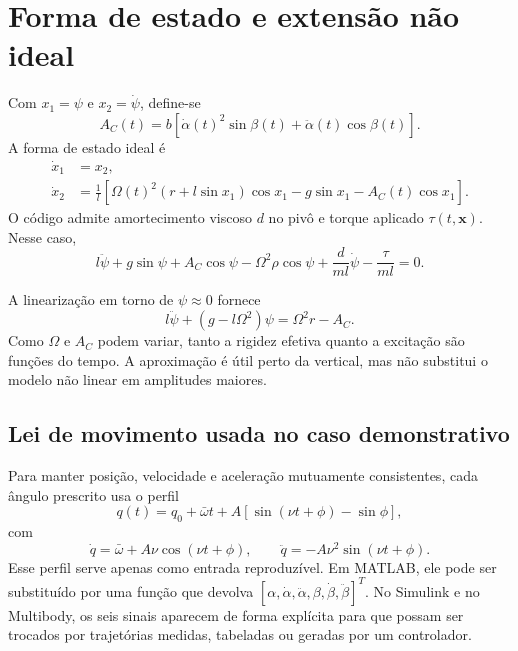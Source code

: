 \documentclass[11pt,a4paper]{article}
\newcommand{\bvec}[1]{\bm{#1}}
\begin{document}
\section{Forma de estado e extensão não ideal}

Com $x_1=\psi$ e $x_2=\dot\psi$, define-se
\begin{equation}
A_C(t)=b\left[\dot\alpha(t)^2\sin\beta(t)
+\ddot\alpha(t)\cos\beta(t)\right].
\end{equation}
A forma de estado ideal é
\begin{align}
\dot x_1&=x_2,\\
\dot x_2&=\frac{1}{l}\left[
\Omega(t)^2(r+l\sin x_1)\cos x_1-g\sin x_1-A_C(t)\cos x_1
\right].
\label{eq:state}
\end{align}
O código admite amortecimento viscoso $d$ no pivô e torque aplicado
$\tau(t,\bvec x)$. Nesse caso,
\begin{equation}
l\ddot\psi+g\sin\psi+A_C\cos\psi
-\Omega^2\rho\cos\psi
+\frac{d}{ml}\dot\psi-\frac{\tau}{ml}=0.
\end{equation}

A linearização em torno de $\psi\approx0$ fornece
\begin{equation}
l\ddot\psi+(g-l\Omega^2)\psi=\Omega^2r-A_C.
\end{equation}
Como $\Omega$ e $A_C$ podem variar, tanto a rigidez efetiva quanto a excitação
são funções do tempo. A aproximação é útil perto da vertical, mas não substitui
o modelo não linear em amplitudes maiores.

\subsection{Lei de movimento usada no caso demonstrativo}

Para manter posição, velocidade e aceleração mutuamente consistentes, cada
ângulo prescrito usa o perfil
\begin{equation}
q(t)=q_0+\bar\omega t+A\left[\sin(\nu t+\phi)-\sin\phi\right],
\end{equation}
com
\begin{equation}
\dot q=\bar\omega+A\nu\cos(\nu t+\phi), \qquad
\ddot q=-A\nu^2\sin(\nu t+\phi).
\end{equation}
Esse perfil serve apenas como entrada reproduzível. Em MATLAB, ele pode ser
substituído por uma função que devolva
$[\alpha,\dot\alpha,\ddot\alpha,\beta,\dot\beta,\ddot\beta]^T$.
No Simulink e no Multibody, os seis sinais aparecem de forma explícita para que
possam ser trocados por trajetórias medidas, tabeladas ou geradas por um
controlador.
\end{document}
